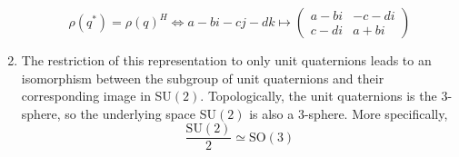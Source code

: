 \begin{theorem}
\begin{enumerate}
        \begin{equation}
          \rho(q^*) = \rho(q)^H \iff a-bi-cj-dk \mapsto \begin{pmatrix}
          a-bi & -c-di \\ c-di & a+bi
          \end{pmatrix}
        \end{equation}
      \item The restriction of this representation to only unit quaternions leads to an isomorphism between the subgroup of unit quaternions and their corresponding image in SU$(2)$. Topologically, the unit quaternions is the $3$-sphere, so the underlying space SU$(2)$ is also a $3$-sphere. More specifically, 
        \begin{equation}
          \frac{\text{SU}(2)}{2} \simeq \text{SO}(3)
        \end{equation}
    \end{enumerate}
  \end{theorem}

